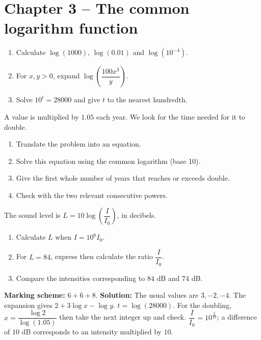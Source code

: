 \section*{Chapter 3 -- The common logarithm function}
\begin{exercise}
\begin{enumerate}
\item Calculate $\log(1000)$, $\log(\num{0,01})$ and $\log(10^{-4})$.
\item For $x,y>0$, expand $\log\!\left(\dfrac{100x^3}{y} \right)$.
\item Solve $10^t=28000$ and give $t$ to the nearest hundredth.
\end{enumerate}
\end{exercise}
\begin{exercise}
A value is multiplied by $\num{1,05}$ each year. We look for the time needed for it to double.
\begin{enumerate}
\item Translate the problem into an equation.
\item Solve this equation using the common logarithm (base 10).
\item Give the first whole number of years that reaches or exceeds double.
\item Check with the two relevant consecutive powers.
\end{enumerate}
\end{exercise}
\begin{exercise}
The sound level is $L=10\log\!\left(\dfrac I{I_0}\right)$, in decibels.
\begin{enumerate}
\item Calculate $L$ when $I=10^6I_0$.
\item For $L=84$, express then calculate the ratio $\dfrac I{I_0}$.
\item Compare the intensities corresponding to $84$ dB and $74$ dB.
\end{enumerate}
\end{exercise}
\begin{solution}\textbf{Marking scheme:} $6+6+8$. \textbf{Solution:} The usual values are $3,-2,-4$. The expansion gives $2+3\log x-\log y$. $t=\log(28000)$. For the doubling, $x=\dfrac{\log2}{\log(\num{1,05})}$ then take the next integer up and check. $\dfrac I{I_0}=10^{\frac L{10}}$; a difference of $10$ dB corresponds to an intensity multiplied by $10$.\end{solution}

